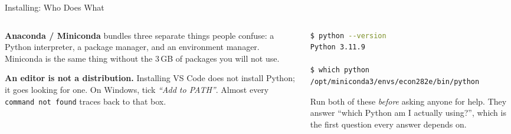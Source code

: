 \begin{frame}[fragile]{Installing: Who Does What}
\begin{columns}[T]
\begin{column}{0.50\textwidth}
\small
\textbf{Anaconda / Miniconda} bundles three separate things people confuse: a Python interpreter, a package manager, and an environment manager. Miniconda is the same thing without the 3\,GB of packages you will not use.
\medskip

\textbf{An editor is not a distribution.} Installing VS Code does not install Python; it goes looking for one.
\medskip
\footnotesize
On Windows, tick \emph{``Add to PATH''}. Almost every \texttt{command not found} traces back to that box.
\end{column}
\begin{column}{0.47\textwidth}
\begin{lstlisting}[language=bash]
$ python --version
Python 3.11.9

$ which python
/opt/miniconda3/envs/econ282e/bin/python
\end{lstlisting}
\vspace{-1mm}
\begin{conceptbox}\footnotesize
Run both of these \emph{before} asking anyone for help. They answer ``which Python am I actually using?'', which is the first question every answer depends on.
\end{conceptbox}
\end{column}
\end{columns}
\vspace{1mm}
\end{frame}


